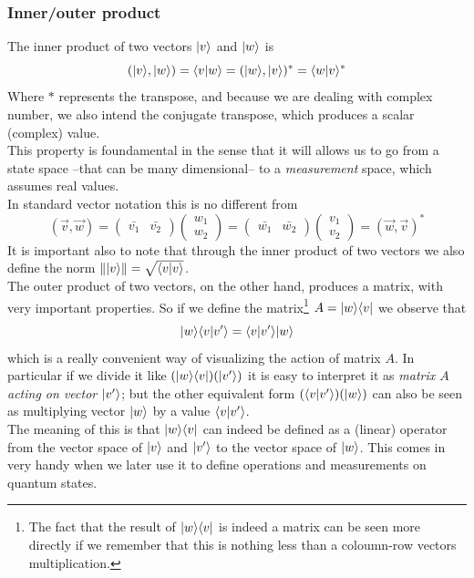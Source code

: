 	
	\subsubsection*{Inner/outer product}
	The inner product of two vectors $|v \rangle$ and $|w \rangle$ is
	$$ ( |v \rangle , |w \rangle ) = \langle v|w\rangle = (|w \rangle , |v \rangle )^{\ast} = \langle w|v\rangle^{\ast} $$
	Where $\ast$ represents the transpose, and because we are dealing with complex number, we also intend the conjugate transpose,	which produces a scalar (complex) value.\\ %
	This property is foundamental in the sense that it will allows us to go from a state space --that can be many dimensional-- to a \textit{measurement} space, which assumes real values.\\ %
	In standard vector notation this is no different from
	$$ ( \vec{v}, \vec{w} ) =  \begin{pmatrix} \bar{v_1} & \bar{v_2}\end{pmatrix} \begin{pmatrix} w_1 \\ w_2 \end{pmatrix} = \begin{pmatrix} \bar{w_1} & \bar{w_2}\end{pmatrix} \begin{pmatrix} v_1 \\ v_2 \end{pmatrix} = ( \vec{w}, \vec{v} )^{\ast}$$
	It is important also to note that through the inner product of two vectors we also define the norm $\Vert|v \rangle\Vert  =  \sqrt{\langle v|v\rangle} $.\\
	
	
	The outer product of two vectors, on the other hand, produces a matrix, with very important properties. So if we define the matrix\footnote{The fact that the result of  $ |w \rangle\langle v| $ is indeed a matrix can be seen more directly if we remember that this is nothing less than a coloumn-row vectors multiplication.} $A =  |w \rangle\langle v| $ we observe that
	$$ |w \rangle\langle v|v'\rangle = \langle v|v'\rangle|w \rangle $$	
	which is a really convenient way of visualizing the action of matrix $A$. In particular if we divide it like $(|w \rangle\langle v|) (|v' \rangle) $ it is easy to interpret it as \textit{matrix $A$ acting on vector $|v' \rangle$}; but the other equivalent form $(\langle v|v'\rangle)(|w \rangle)$ can also be seen as multiplying vector $|w \rangle$ by a value $\langle v|v'\rangle$. \\
	The meaning of this is that $|w \rangle\langle v|$ can indeed be defined as a (linear) operator from the vector space of $|v \rangle$ and $|v' \rangle$ to the vector space of $|w \rangle$. This comes in very handy when we later use it to define operations and measurements on quantum states. %
	
